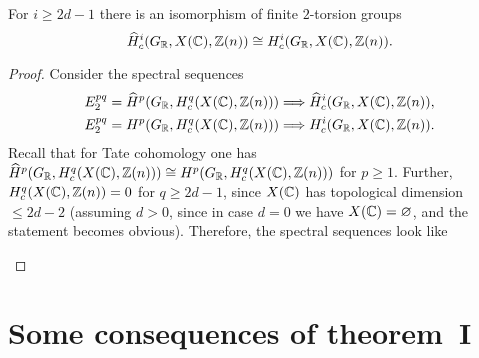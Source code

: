 \documentclass{article}
\numberwithin{equation}{section}
\begin{document}
\begin{lemma}
  \label{lemma:Tate-vs-normal-cohomology-of-X(C)}
  For $i \ge 2d - 1$ there is an isomorphism of finite $2$-torsion groups
  \[ \widehat{H}^i_c (G_{\mathbb{R}}, X (\mathbb{C}), \mathbb{Z}(n)) \cong
    H^i_c (G_{\mathbb{R}}, X (\mathbb{C}), \mathbb{Z}(n)). \]

  \begin{proof}
    Consider the spectral sequences
    \begin{align*}
      E^{pq}_2 = \widehat{H}^p (G_{\mathbb{R}}, H^q_c (X (\mathbb{C}), \mathbb{Z}(n))) & \Longrightarrow
      \widehat{H}^i_c (G_{\mathbb{R}}, X (\mathbb{C}), \mathbb{Z}(n)), \\
      E^{pq}_2 = H^p (G_{\mathbb{R}}, H^q_c (X (\mathbb{C}), \mathbb{Z}(n))) & \Longrightarrow
      H^i_c (G_{\mathbb{R}}, X (\mathbb{C}), \mathbb{Z}(n)).
    \end{align*}
    Recall that for Tate cohomology one has
    $\widehat{H}^p (G_{\mathbb{R}}, H^q_c (X (\mathbb{C}), \mathbb{Z}(n))) \cong
    H^p (G_{\mathbb{R}}, H^q_c (X (\mathbb{C}), \mathbb{Z}(n)))$ for $p \ge 1$.
    Further, $H^q_c (X (\mathbb{C}), \mathbb{Z}(n)) = 0$
    for $q \ge 2d-1$, since $X (\mathbb{C})$ has topological dimension $\le 2d - 2$
    (assuming $d > 0$, since in case $d = 0$ we have $X (\mathbb{C}) = \varnothing$, and
    the statement becomes obvious).  Therefore, the spectral sequences look like
    \begin{center}
    \end{center}
  \end{proof}
\end{lemma}


\section{Some consequences of theorem~I}
\label{sec:consequences-of-theorem-I}
\end{document}
